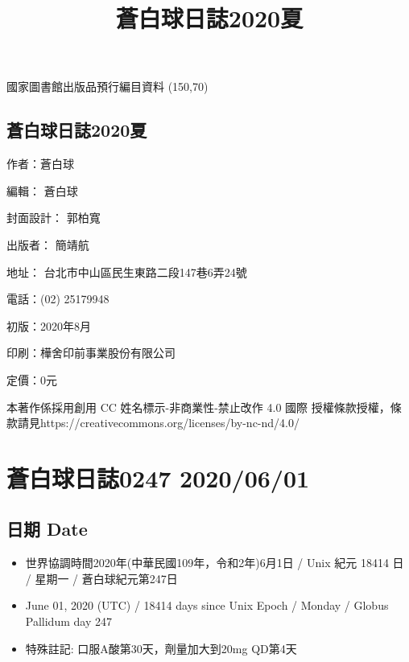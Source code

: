 \documentclass[a5paper, 11pt
]{book}
\title{蒼白球日誌2020夏}
\date{}
\providecommand{\tightlist}{%
  \setlength{\itemsep}{0pt}\setlength{\parskip}{0pt}}
\begin{document}
\clearpage\maketitle
\thispagestyle{empty}
\subsection{}
\begin{flushleft}
國家圖書館出版品預行編目資料 \linebreak
\framebox(150,70){}
\end{flushleft}
\subsection{蒼白球日誌2020夏}
\begin{flushleft}
作者：蒼白球

編輯： 蒼白球

封面設計： 郭柏寬

出版者： 簡靖航

地址： 台北市中山區民生東路二段147巷6弄24號

電話：(02) 25179948

初版：2020年8月

印刷：樺舍印前事業股份有限公司

定價：0元

本著作係採用創用 CC 姓名標示-非商業性-禁止改作 4.0 國際 授權條款授權，條款請見\linebreak https://creativecommons.org/licenses/by-nc-nd/4.0/
\end{flushleft}
\clearpage
\tableofcontents

\hypertarget{ux84bcux767dux7403ux65e5ux8a8c0247-20200601}{%
\section{蒼白球日誌0247
2020/06/01}\label{ux84bcux767dux7403ux65e5ux8a8c0247-20200601}}

\hypertarget{ux65e5ux671f-date}{%
\subsection{日期 Date}\label{ux65e5ux671f-date}}

\begin{itemize}
\tightlist
\item
  世界協調時間2020年(中華民國109年，令和2年)6月1日 / Unix 紀元 18414 日
  / 星期一 / 蒼白球紀元第247日
\item
  June 01, 2020 (UTC) / 18414 days since Unix Epoch / Monday / Globus
  Pallidum day 247
\item
  特殊註記: 口服A酸第30天，劑量加大到20mg QD第4天
\end{itemize}
\end{document}

